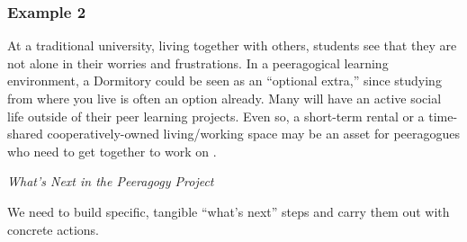 \subsubsection*{Example 2}
At a traditional university,  living together with others, students see that they are not alone in their worries and frustrations. In a peeragogical learning environment, a Dormitory could be seen as an ``optional extra,'' since studying
from where you live is often an option already. Many will have an active social life outside of their peer learning projects.  Even so, a short-term rental or a time-shared cooperatively-owned living\slash working space may be an asset for peeragogues who need to get together to work on .


\begin{framed}
\noindent 
\emph{What's Next in the Peeragogy Project}
\begin{collectinmacro}{\SpecificWN}{}{}
We need to build specific, tangible ``what's next'' steps and carry them out with concrete actions. 
\end{collectinmacro}
\SpecificWN
\end{framed}

